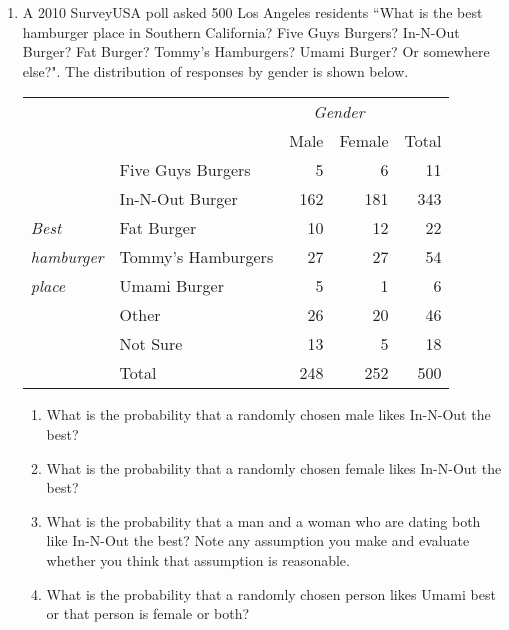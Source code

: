 \documentclass{article}\usepackage[]{graphicx}\usepackage[]{color}
\begin{document}
\begin{enumerate}
\item A 2010 SurveyUSA poll asked 500 Los Angeles residents ``What is the best hamburger place in Southern California? Five Guys Burgers? In-N-Out Burger? Fat Burger? Tommy's Hamburgers? Umami Burger? Or somewhere else?". The distribution of responses by gender is shown below.
\begin{center}
\begin{tabular}{l p{4cm} r r r }
&  					& \multicolumn{2}{c}{\textit{Gender}} \\
\cline{3-4}
&								& Male	& Female 	& Total\\
\cline{2-5}
& Five Guys Burgers					&5		&6	 	& 11	\\
& In-N-Out Burger					&162	&181	& 343 \\
\textit{Best} & Fat Burger				&10		&12	 	& 22 \\
\textit{hamburger} & Tommy's Hamburgers	&27		&27	 	& 54	\\ 
\textit{place} & Umami Burger			&5		&1	 	& 6 \\
& Other							&26		&20	 	& 46 \\
& Not Sure						&13		&5	 	& 18 \\
\cline{2-5}
&Total							&248	&252	& 500
\end{tabular}
\end{center}
\begin{enumerate}
\item What is the probability that a randomly chosen male likes In-N-Out the best?
\item What is the probability that a randomly chosen female likes In-N-Out the best?
\item What is the probability that a man and a woman who are dating both like In-N-Out the best? Note any assumption you make and evaluate whether you think that assumption is reasonable.
\item What is the probability that a randomly chosen person likes Umami best or that person is female or both?
\end{enumerate}



\end{enumerate}
\end{document}
